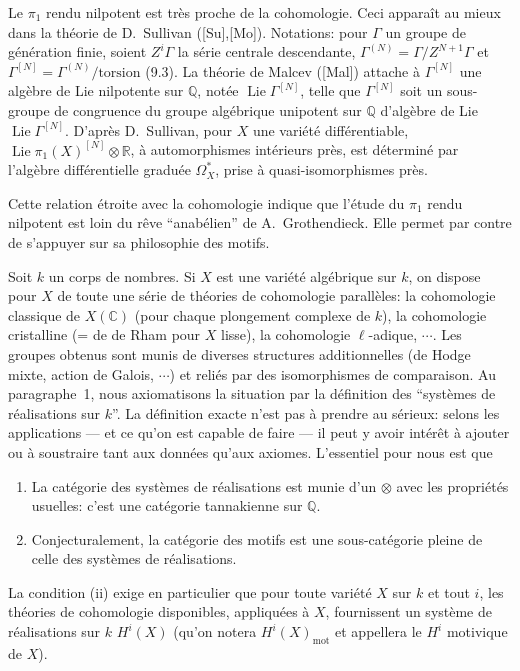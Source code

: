 \documentclass[12pt,a4paper]{article}
\theoremstyle{plain}
\theoremstyle{definition}
\theoremstyle{remark}
\DeclareMathOperator{\Lie}{Lie}
\newcommand{\mot}{\mathrm{mot}}
\providecommand{\mot}{\mathrm{mot}}
\providecommand{\Lie}{\operatorname{Lie}}
\begin{document}
Le $\pi_1$ rendu nilpotent est tr\`es proche de la cohomologie. Ceci appara\^it au
mieux dans la th\'eorie de D.~Sullivan ([Su],[Mo]). Notations: pour $\Gamma$ un groupe
de g\'en\'eration finie, soient $Z^i\Gamma$ la s\'erie centrale descendante,
$\Gamma^{(N)} = \Gamma/Z^{N+1}\Gamma$ et $\Gamma^{[N]} = \Gamma^{(N)}/\text{torsion}$ (9.3).
La th\'eorie de Malcev ([Mal]) attache \`a $\Gamma^{[N]}$ une alg\`ebre de Lie nilpotente
sur $\mathbb{Q}$, not\'ee $\Lie\Gamma^{[N]}$, telle que $\Gamma^{[N]}$ soit un sous-groupe de
congruence du groupe alg\'ebrique unipotent sur $\mathbb{Q}$ d'alg\`ebre de Lie
$\Lie\Gamma^{[N]}$. D'apr\`es D.~Sullivan, pour $X$ une vari\'et\'e diff\'erentiable,
$\Lie\pi_1(X)^{[N]} \otimes \mathbb{R}$, \`a automorphismes int\'erieurs pr\`es, est
d\'etermin\'e par l'alg\`ebre diff\'erentielle gradu\'ee $\Omega_X^*$, prise \`a
quasi-isomorphismes pr\`es.

Cette relation \'etroite avec la cohomologie indique que l'\'etude du $\pi_1$ rendu
nilpotent est loin du r\^eve ``anab\'elien'' de A.~Grothendieck. Elle permet par contre
de s'appuyer sur sa philosophie des motifs.

Soit $k$ un corps de nombres. Si $X$ est une vari\'et\'e alg\'ebrique sur $k$, on dispose
pour $X$ de toute une s\'erie de th\'eories de cohomologie parall\`eles: la cohomologie
classique de $X(\mathbb{C})$ (pour chaque plongement complexe de $k$), la cohomologie
cristalline (= de de Rham pour $X$ lisse), la cohomologie $\ell$-adique, $\cdots$.
Les groupes obtenus sont munis de diverses structures additionnelles (de Hodge mixte,
action de Galois, $\cdots$) et reli\'es par des isomorphismes de comparaison. Au paragraphe~1,
nous axiomatisons la situation par la d\'efinition des ``syst\`emes de r\'ealisations sur $k$''.
La d\'efinition exacte n'est pas \`a prendre au s\'erieux: selons les applications --- et ce qu'on
est capable de faire --- il peut y avoir int\'er\^et \`a ajouter ou \`a soustraire tant aux
donn\'ees qu'aux axiomes. L'essentiel pour nous est que
\begin{enumerate}[label=(\roman*)]
\item La cat\'egorie des syst\`emes de r\'ealisations est munie d'un $\otimes$ avec les
propri\'et\'es usuelles: c'est une cat\'egorie tannakienne sur $\mathbb{Q}$.
\item Conjecturalement, la cat\'egorie des motifs est une sous-cat\'egorie pleine de
celle des syst\`emes de r\'ealisations.
\end{enumerate}

La condition (ii) exige en particulier que pour toute vari\'et\'e $X$ sur $k$ et tout $i$,
les th\'eories de cohomologie disponibles, appliqu\'ees \`a $X$, fournissent un syst\`eme de
r\'ealisations sur $k$ $H^i(X)$ (qu'on notera $H^i(X)_{\mot}$ et appellera le $H^i$
motivique de $X$).
\end{document}
